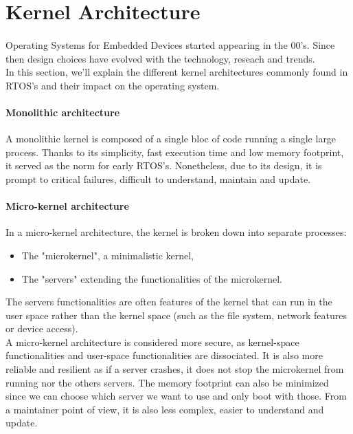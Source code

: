 \section{Kernel Architecture}


\paragraph{}
Operating Systems for Embedded Devices started appearing in the 00's.
Since then design choices have evolved with the technology, reseach and trends.
\\
In this section, we'll explain the different kernel architectures commonly found in RTOS's and their impact on the operating system.

\paragraph{Monolithic architecture}
A monolithic kernel is composed of a single bloc of code running a single large process.
Thanks to its simplicity, fast execution time and low memory footprint, it served as the norm for early RTOS's.
Nonetheless, due to its design, it is prompt to critical failures, difficult to understand, maintain and update.

\paragraph{Micro-kernel architecture}
In a micro-kernel architecture, the kernel is broken down into separate processes:

\begin{itemize}
    \item The "microkernel", a minimalistic kernel,
    \item The "servers" extending the functionalities of the microkernel.
\end{itemize}

The servers functionalities are often features of the kernel that can run in the user space rather than the kernel space (such as the file system, network features or device access).
\\
A micro-kernel architecture is considered more secure, as kernel-space functionalities and user-space functionalities are dissociated.
It is also more reliable and resilient as if a server crashes, it does not stop the microkernel from running nor the others servers.
The memory footprint can also be minimized since we can choose which server we want to use and only boot with those.
From a maintainer point of view, it is also less complex, easier to understand and update.

